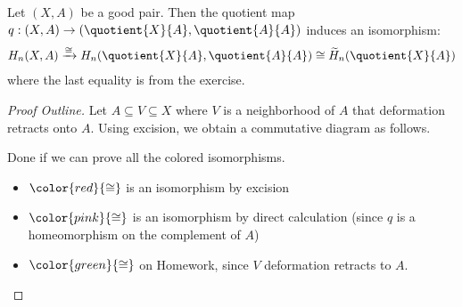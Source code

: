 \begin{theorem}\label{thm:good-pairs-relative-homology}
	Let $(X, A)$ be a good pair. Then the quotient map $q : (X, A) \to (\quotient{X}{A} , \quotient{A}{A} )$ induces an isomorphism:
	\begin{align*}
		H_n(X, A) \xrightarrow{\cong} H_n(\quotient{X}{A}, \quotient{A}{A}) \cong \widetilde{H}_n(\quotient{X}{A})
	\end{align*}
	where the last equality is from the exercise.
\end{theorem}

\begin{proof}[Proof Outline]
	Let $A \subseteq V \subseteq X$ where $V$ is a neighborhood of $A$ that deformation retracts onto $A$. Using excision, we obtain a commutative diagram as follows.
	\par

	\par Done if we can prove all the colored isomorphisms.
	\begin{itemize}
		\item $\color{red}{\cong}$ is an isomorphism by excision
		\item $\color{pink}{\cong}$ is an isomorphism by direct calculation (since $q$ is a homeomorphism on the complement of $A$)
		\item $\color{green}{\cong}$ on Homework, since $V$ deformation retracts to $A$.
	\end{itemize}
\end{proof}